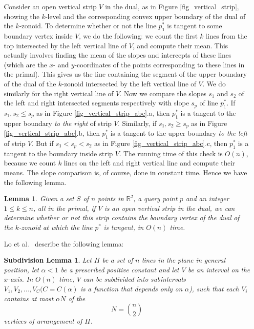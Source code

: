\documentclass[charterfonts,lotsofwhite]{patmorin}
\newtheorem{lemma}{Lemma}
\begin{document}
Consider an open vertical strip $V$ in the dual, as in Figure
\ref{fig_vertical_strip}, showing the $k$-level and the corresponding
convex upper boundary of the dual of the $k$-zonoid. To determine
whether or not the line $p_1^*$ is tangent to some boundary vertex
inside $V$, we do the following: we count the first $k$ lines from the
top intersected by the left vertical line of $V$, and compute their
mean. This actually involves finding the mean of the slopes and
intercepts of these lines (which are the $x$- and $y$-coordinates of
the points corresponding to these lines in the primal). This gives us
the line containing the segment of the upper boundary of the dual of
the $k$-zonoid intersected by the left vertical line of $V$. We do
similarly for the right vertical line of $V$. Now we compare the
slopes $s_1$ and $s_2$ of the left and right intersected segments
respectively with slope $s_p$ of line $p_1^*$. If $s_1, s_2 \le s_p$
as in Figure \ref{fig_vertical_strip_abc}.a, then $p_1^*$ is a tangent
to the upper boundary \emph{to the right} of strip $V$. Similarly, if
$s_1, s_2 \ge s_p$ as in Figure \ref{fig_vertical_strip_abc}.b, then
$p_1^*$ is a tangent to the upper boundary \emph{to the left} of strip
$V$. But if $s_1 < s_p < s_2$ as in Figure
\ref{fig_vertical_strip_abc}.c, then $p_1^*$ is a tangent to the boundary
inside strip $V$. The running time of this check is $O(n)$, because we
count $k$ lines on the left and right vertical line and compute their
means. The slope comparison is, of course, done in constant time.
Hence we have the following lemma. 

\begin{lemma}\label{lemma_vertical_strip}
Given a set $S$ of $n$ points in $\mathbb{R}^2$, a query point $p$ and
an integer $1 \le k \le n$, all in the primal, if $V$ is an open
vertical strip in the dual, we can determine whether or not this strip contains the boundary vertex of the dual of the $k$-zonoid at which the line $p^*$ is tangent, in $O(n)$ time.
\end{lemma}

Lo et al.\ \cite{algorithms_for_ham_sandwich_cuts} describe the following lemma: 
\newtheorem*{thma}{Subdivision Lemma}
\begin{thma}
Let $H$ be a set of $n$ lines in the plane in general position, let $\alpha < 1$ be a prescribed positive constant and let $V$ be an interval on the $x$-axis. In $O(n)$ time, $V$ can be subdivided into subintervals $V_1, V_2, \ldots, V_C (C = C(\alpha)$ is a function that depends only on $\alpha$), such that each $V_i$ contains at most $\alpha N$ of the \[N = {n \choose 2}\] vertices of arrangement of $H$. 
\end{thma}
\end{document}
